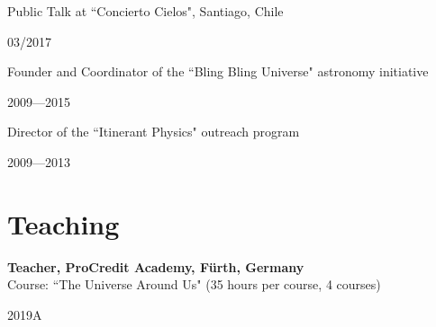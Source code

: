 \documentclass[12pt, a4paper]{article} %
\begin{document}
\vspace{0.2cm}

\begin{minipage}[t]{0.7\textwidth}
\begin{flushleft}%
  \setlength{\leftskip}{0.2cm}%
Public Talk at ``Concierto Cielos", Santiago, Chile
\end{flushleft}
\end{minipage}
\begin{minipage}[t]{0.3\textwidth}
\hfill 03/2017
\end{minipage}

\vspace{0.2cm}

\begin{minipage}[t]{0.8\textwidth}
\begin{flushleft}%
  \setlength{\leftskip}{0.2cm}%
Founder and Coordinator of the ``Bling Bling Universe" astronomy initiative
\end{flushleft}
\end{minipage}
\begin{minipage}[t]{0.2\textwidth}
\hfill 2009---2015
\end{minipage}


\vspace{0.2cm}


\begin{minipage}[t]{0.7\textwidth}
\begin{flushleft}%
  \setlength{\leftskip}{0.2cm}%
Director of the ``Itinerant Physics" outreach program
\end{flushleft}
\end{minipage}
\begin{minipage}[t]{0.3\textwidth}
\hfill 2009---2013
\end{minipage}

\section*{Teaching}

\begin{minipage}[t]{0.7\textwidth}
\begin{flushleft}%
  \setlength{\leftskip}{0.2cm}%
\textbf{Teacher, ProCredit Academy, F\"urth, Germany}\\
Course: ``The Universe Around Us" (35 hours per course, 4 courses)
\end{flushleft}
\end{minipage}
\begin{minipage}[t]{0.3\textwidth}
\hfill 2019A
\end{minipage}\\
\end{document}

